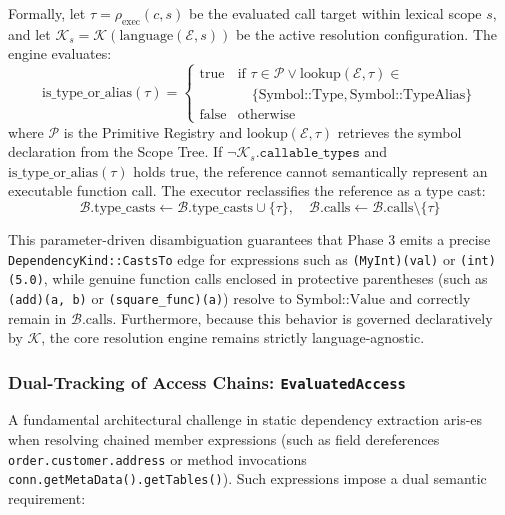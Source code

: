 Formally, let $\tau = \rho_{\text{exec}}(c, s)$ be the evaluated call
target within
lexical scope $s$, and let $\mathcal{K}_s =
\mathcal{K}(\text{language}(\mathcal{E}, s))$
be the active resolution configuration. The engine evaluates:
\begin{equation}
  \text{is\_type\_or\_alias}(\tau) =
  \begin{cases}
    \text{true} & \text{if } \tau \in \mathcal{P} \lor
    \text{lookup}(\mathcal{E}, \tau) \in \\
    & \quad \{ \text{Symbol::Type}, \text{Symbol::TypeAlias} \} \\
    \text{false} & \text{otherwise}
  \end{cases}
\end{equation}
where $\mathcal{P}$ is the Primitive Registry and
$\text{lookup}(\mathcal{E}, \tau)$
retrieves the symbol declaration from the Scope Tree. If $\neg
\mathcal{K}_s.\texttt{callable\_types}$
and $\text{is\_type\_or\_alias}(\tau)$ holds true, the reference
cannot semantically
represent an executable function call. The executor reclassifies the
reference as a
type cast:
\begin{equation}
  \mathcal{B}.\text{type\_casts} \gets \mathcal{B}.\text{type\_casts}
  \cup \{ \tau \}, \quad \mathcal{B}.\text{calls} \gets
  \mathcal{B}.\text{calls} \setminus \{ \tau \}
\end{equation}

This parameter-driven disambiguation guarantees that Phase 3 emits a precise
\texttt{DependencyKind::CastsTo} edge for expressions such as
\texttt{(MyInt)(val)} or
\texttt{(int)(5.0)}, while genuine function calls enclosed in
protective parentheses
(such as \texttt{(add)(a, b)} or \texttt{(square\_func)(a)}) resolve
to $\text{Symbol::Value}$
and correctly remain in $\mathcal{B}.\text{calls}$. Furthermore, because this
behavior is governed declaratively by $\mathcal{K}$, the core
resolution engine remains
strictly language-agnostic.

\subsubsection{Dual-Tracking of Access Chains: \texttt{EvaluatedAccess}}
\label{sec:evaluated_access}

A fundamental architectural challenge in static dependency extraction
aris-\linebreak es when
resolving chained member expressions (such as field dereferences \linebreak
  \texttt{order.customer.address}
or method invocations \texttt{conn.getMetaData().getTa}\-\texttt{bles()}). Such
expressions impose
a dual semantic requirement:

